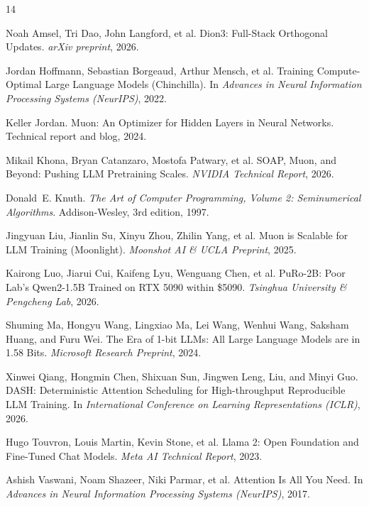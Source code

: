 \documentclass[11pt,a4paper]{article}
\begin{document}
\begin{thebibliography}{14}

Noah Amsel, Tri Dao, John Langford, et al.
\newblock Dion3: Full-Stack Orthogonal Updates.
\newblock \emph{arXiv preprint}, 2026.

Jordan Hoffmann, Sebastian Borgeaud, Arthur Mensch, et al.
\newblock Training Compute-Optimal Large Language Models (Chinchilla).
\newblock In \emph{Advances in Neural Information Processing Systems (NeurIPS)}, 2022.

Keller Jordan.
\newblock Muon: An Optimizer for Hidden Layers in Neural Networks.
\newblock Technical report and blog, 2024.

Mikail Khona, Bryan Catanzaro, Mostofa Patwary, et al.
\newblock SOAP, Muon, and Beyond: Pushing LLM Pretraining Scales.
\newblock \emph{NVIDIA Technical Report}, 2026.

Donald~E. Knuth.
\newblock \emph{The Art of Computer Programming, Volume 2: Seminumerical Algorithms}.
\newblock Addison-Wesley, 3rd edition, 1997.

Jingyuan Liu, Jianlin Su, Xinyu Zhou, Zhilin Yang, et al.
\newblock Muon is Scalable for LLM Training (Moonlight).
\newblock \emph{Moonshot AI \& UCLA Preprint}, 2025.

Kairong Luo, Jiarui Cui, Kaifeng Lyu, Wenguang Chen, et al.
\newblock PuRo-2B: Poor Lab's Qwen2-1.5B Trained on RTX 5090 within \$5090.
\newblock \emph{Tsinghua University \& Pengcheng Lab}, 2026.

Shuming Ma, Hongyu Wang, Lingxiao Ma, Lei Wang, Wenhui Wang, Saksham Huang, and Furu Wei.
\newblock The Era of 1-bit LLMs: All Large Language Models are in 1.58 Bits.
\newblock \emph{Microsoft Research Preprint}, 2024.

Xinwei Qiang, Hongmin Chen, Shixuan Sun, Jingwen Leng, Liu, and Minyi Guo.
\newblock DASH: Deterministic Attention Scheduling for High-throughput Reproducible LLM Training.
\newblock In \emph{International Conference on Learning Representations (ICLR)}, 2026.

Hugo Touvron, Louis Martin, Kevin Stone, et al.
\newblock Llama 2: Open Foundation and Fine-Tuned Chat Models.
\newblock \emph{Meta AI Technical Report}, 2023.

Ashish Vaswani, Noam Shazeer, Niki Parmar, et al.
\newblock Attention Is All You Need.
\newblock In \emph{Advances in Neural Information Processing Systems (NeurIPS)}, 2017.


\end{thebibliography}
\end{document}
